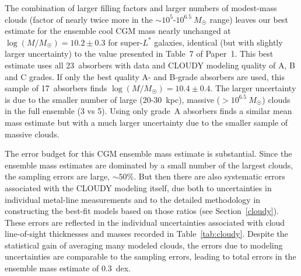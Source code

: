 \documentclass[twocolumn,twocolappendix,tighten,times]{aastex6}
\begin{document}
The combination of larger filling factors and larger numbers of modest-mass clouds 
(factor of nearly twice more in the $\sim10^5$-$10^{6.5}~M_{\Sun}$ range) leaves 
our best estimate for the ensemble cool CGM mass nearly unchanged at 
$\log{(M/M_{\Sun})} = 10.2\pm0.3$ for super-$L^*$ galaxies, identical (but with 
slightly larger uncertainty) to the value presented in Table~7 of Paper~1. This 
best estimate uses all 23~absorbers with data and CLOUDY modeling quality of A, B 
and C grades. If only the best quality A- and B-grade absorbers are used, this 
sample of 17~absorbers finds $\log{(M/M_{\Sun})} = 10.4\pm0.4$. The larger 
uncertainty is due to the smaller number of large (20-30~kpc), massive 
($>10^{6.5}~M_{\Sun}$) clouds in the full ensemble (3 vs 5). Using only grade~A 
absorbers finds a similar mean mass estimate but with a much larger uncertainty 
due to the smaller sample of massive clouds. 

The error budget for this CGM ensemble mass estimate is substantial. Since the 
ensemble mass estimates are dominated by a small number of the largest clouds, 
the sampling errors are large, $\sim50$\%. But then there are also systematic 
errors associated with the CLOUDY modeling itself, due both to uncertainties in 
individual metal-line measurements and to the detailed methodology in constructing 
the best-fit models based on those ratios (see Section~\ref{cloudy}). These errors 
are reflected in the individual uncertainties associated with cloud line-of-sight 
thicknesses and masses recorded in Table~\ref{tab:cloudy}. Despite the statistical 
gain of averaging many modeled clouds, the errors due to modeling uncertainties 
are comparable to the sampling errors, leading to total errors in the ensemble 
mass estimate of 0.3~dex. 
\end{document}
